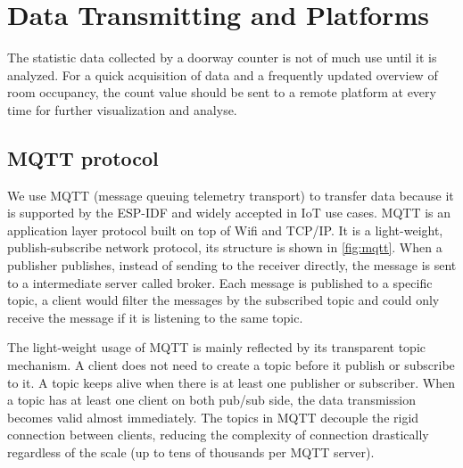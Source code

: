 \chapter{Data Transmitting and Platforms} \label{ch:platform}
The statistic data collected by a doorway counter is not of much use until it is analyzed. For a quick acquisition of data and a frequently updated overview of room occupancy, the count value should be sent to a remote platform at every time for further visualization and analyse.
\section{MQTT protocol}
We use MQTT (message queuing telemetry transport) to transfer data because it is supported by the ESP-IDF and widely accepted in IoT use cases. MQTT is an application layer protocol built on top of Wifi and TCP/IP. It is a light-weight, publish-subscribe network protocol, its structure is shown in \autoref{fig:mqtt}. When a publisher publishes, instead of sending to the receiver directly, the message is sent to a intermediate server called broker. Each message is published to a specific topic, a client would filter the messages by the subscribed topic and could only receive the message if it is listening to the same topic.

The light-weight usage of MQTT is mainly reflected by its transparent topic mechanism. A client does not need to create a topic before it publish or subscribe to it. A topic keeps alive when there is at least one publisher or subscriber. When a topic has at least one client on both pub/sub side, the data transmission becomes valid almost immediately. The topics in MQTT decouple the rigid connection between clients, reducing the complexity of connection drastically regardless of the scale (up to tens of thousands per MQTT server).

